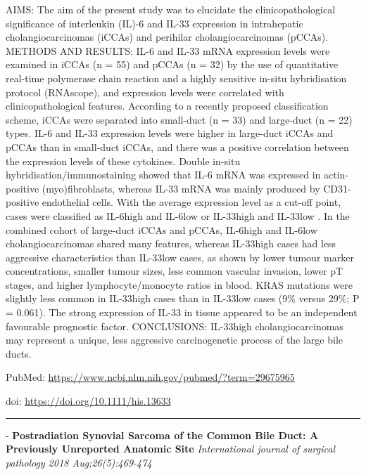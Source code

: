 \documentclass[]{article}
\begin{document}
AIMS: The aim of the present study was to elucidate the
clinicopathological significance of interleukin (IL)-6 and IL-33
expression in intrahepatic cholangiocarcinomas (iCCAs) and perihilar
cholangiocarcinomas (pCCAs). METHODS AND RESULTS: IL-6 and IL-33 mRNA
expression levels were examined in iCCAs (n = 55) and pCCAs (n = 32) by
the use of quantitative real-time polymerase chain reaction and a highly
sensitive in-situ hybridisation protocol (RNAscope), and expression
levels were correlated with clinicopathological features. According to a
recently proposed classification scheme, iCCAs were separated into
small-duct (n = 33) and large-duct (n = 22) types. IL-6 and IL-33
expression levels were higher in large-duct iCCAs and pCCAs than in
small-duct iCCAs, and there was a positive correlation between the
expression levels of these cytokines. Double in-situ
hybridisation/immunostaining showed that IL-6 mRNA was expressed in
actin-positive (myo)fibroblasts, whereas IL-33 mRNA was mainly produced
by CD31-positive endothelial cells. With the average expression level as
a cut-off point, cases were classified as IL-6high and IL-6low or
IL-33high and IL-33low . In the combined cohort of large-duct iCCAs and
pCCAs, IL-6high and IL-6low cholangiocarcinomas shared many features,
whereas IL-33high cases had less aggressive characteristics than
IL-33low cases, as shown by lower tumour marker concentrations, smaller
tumour sizes, less common vascular invasion, lower pT stages, and higher
lymphocyte/monocyte ratios in blood. KRAS mutations were slightly less
common in IL-33high cases than in IL-33low cases (9\% versus 29\%; P =
0.061). The strong expression of IL-33 in tissue appeared to be an
independent favourable prognostic factor. CONCLUSIONS: IL-33high
cholangiocarcinomas may represent a unique, less aggressive
carcinogenetic process of the large bile ducts.

PubMed: \url{https://www.ncbi.nlm.nih.gov/pubmed/?term=29675965}

doi: \url{https://doi.org/10.1111/his.13633}

{}

{}

\begin{center}\rule{0.5\linewidth}{\linethickness}\end{center}

 - \textbf{Postradiation Synovial Sarcoma of the Common Bile Duct: A
Previously Unreported Anatomic Site} \emph{International journal of
surgical pathology 2018 Aug;26(5):469-474}
\end{document}
